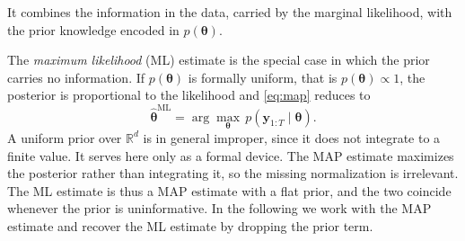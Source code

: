 

It combines the information in the data, carried by the marginal likelihood, with the prior knowledge encoded in $p(\boldsymbol{\theta})$. 

The \emph{ maximum likelihood} (ML) estimate is the special case in which the prior carries no information. If $p(\boldsymbol{\theta})$ is formally uniform, that is $p(\boldsymbol{\theta}) \propto 1$, the posterior is proportional to the likelihood and \eqref{eq:map} reduces to
\begin{equation}\label{eq:ml}
    \hat{\boldsymbol{\theta}}^{\mathrm{ML}} = \arg\max_{\boldsymbol{\theta}} \, p(\mathbf{y}_{1:T} \mid \boldsymbol{\theta}).
\end{equation}
A uniform prior over $\mathbb{R}^d$ is in general improper, since it does not integrate to a finite value. It serves here only as a formal device. The MAP estimate maximizes the posterior rather than integrating it, so the missing normalization is irrelevant. The ML estimate is thus a MAP estimate with a flat prior, and the two coincide whenever the prior is uninformative. In the following we work with the MAP estimate and recover the ML estimate by dropping the prior term.
